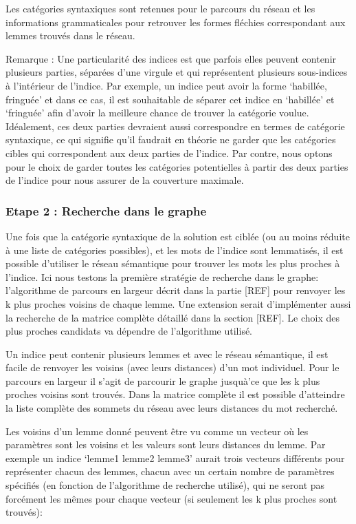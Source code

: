 Les catégories syntaxiques sont retenues pour le parcours du réseau et les informations grammaticales pour retrouver les formes fléchies correspondant aux lemmes trouvés dans le réseau.

Remarque : Une particularité des indices est que parfois elles peuvent contenir plusieurs parties, séparées d'une virgule et qui représentent plusieurs sous-indices à l'intérieur de l'indice. Par exemple, un indice peut avoir la forme \lq{habillée, fringuée}\rq{} et dans ce cas, il est souhaitable de séparer cet indice en \lq{habillée}\rq{} et \lq{fringuée}\rq{} afin d'avoir la meilleure chance de trouver la catégorie voulue. Idéalement, ces deux parties devraient aussi correspondre en termes de catégorie syntaxique, ce qui signifie qu'il faudrait en théorie ne garder que les catégories cibles qui correspondent aux deux parties de l'indice. Par contre, nous optons pour le choix de garder toutes les catégories potentielles à partir des deux parties de l'indice pour nous assurer de la couverture maximale. 

\subsubsection{Etape 2 : Recherche dans le graphe}%

Une fois que la catégorie syntaxique de la solution est ciblée (ou au moins réduite à une liste de catégories possibles), et les mots de l'indice sont lemmatisés, il est possible d'utiliser le réseau sémantique pour trouver les mots les plus proches à l'indice. Ici nous testons la première stratégie de recherche dans le graphe: l'algorithme de parcours en largeur décrit dans la partie [REF] pour renvoyer les k plus proches voisins de chaque lemme. Une extension serait d'implémenter aussi la recherche de la matrice complète détaillé dans la section [REF]. Le choix des plus proches candidats va dépendre de l'algorithme utilisé.

Un indice peut contenir plusieurs lemmes et avec le réseau sémantique, il est facile de renvoyer les voisins (avec leurs distances) d'un mot individuel. Pour le parcours en largeur il s'agit de parcourir le graphe jusquà'ce que les k plus proches voisins sont trouvés. Dans la matrice complète il est possible d'atteindre la liste complète des sommets du réseau avec leurs distances du mot recherché. 

Les voisins d'un lemme donné peuvent être vu comme un vecteur où les paramètres sont les voisins et les valeurs sont leurs distances du lemme. Par exemple un indice \lq{lemme1 lemme2 lemme3}\rq{} aurait trois vecteurs différents pour représenter chacun des lemmes, chacun avec un certain nombre de paramètres spécifiés (en fonction de l'algorithme de recherche utilisé), qui ne seront pas forcément les mêmes pour chaque vecteur (si seulement les k plus proches sont trouvés):

